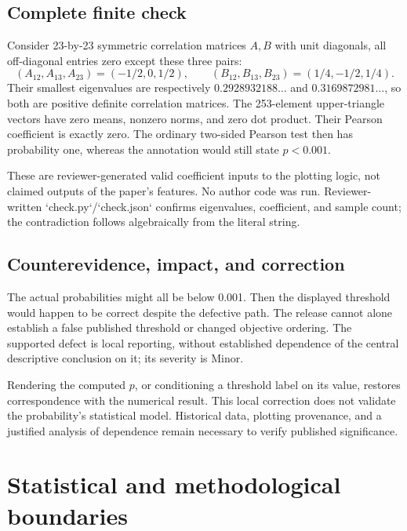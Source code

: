 \documentclass[10pt]{article}
\begin{document}
\subsection*{Complete finite check}
Consider 23-by-23 symmetric correlation matrices \(A,B\) with unit diagonals, all off-diagonal entries zero except these three pairs: \[(A_{12},A_{13},A_{23})=(-1/2,0,1/2),\qquad
 (B_{12},B_{13},B_{23})=(1/4,-1/2,1/4).\] Their smallest eigenvalues are respectively \(0.2928932188\ldots\) and \(0.3169872981\ldots\), so both are positive definite correlation matrices. The 253-element upper-triangle vectors have zero means, nonzero norms, and zero dot product. Their Pearson coefficient is exactly zero. The ordinary two-sided Pearson test then has probability one, whereas the annotation would still state \(p<0.001\).\par
These are reviewer-generated valid coefficient inputs to the plotting logic, not claimed outputs of the paper’s features. No author code was run. Reviewer-written `check.py`/`check.json` confirms eigenvalues, coefficient, and sample count; the contradiction follows algebraically from the literal string.\par
\subsection*{Counterevidence, impact, and correction}
The actual probabilities might all be below 0.001. Then the displayed threshold would happen to be correct despite the defective path. The release cannot alone establish a false published threshold or changed objective ordering. The supported defect is local reporting, without established dependence of the central descriptive conclusion on it; its severity is Minor.\par
Rendering the computed \(p\), or conditioning a threshold label on its value, restores correspondence with the numerical result. This local correction does not validate the probability’s statistical model. Historical data, plotting provenance, and a justified analysis of dependence remain necessary to verify published significance.\par
\section*{Statistical and methodological boundaries}
\end{document}
